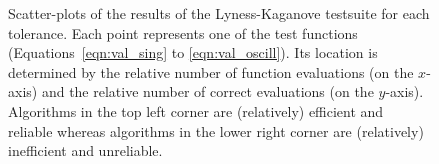 \documentclass[]{article}
\begin{document}
\begin{figure}
    \begin{center}
    \end{center}
    \caption{Scatter-plots of the results of the Lyness-Kaganove
        testsuite for each tolerance. Each point represents one of
        the test functions (Equations~\ref{eqn:val_sing} to \ref{eqn:val_oscill}).
        Its location is determined by the relative number of function evaluations
        (on the $x$-axis) and the relative number of correct evaluations
        (on the $y$-axis). Algorithms in the top left corner are (relatively)
        efficient and reliable whereas algorithms in the lower right corner are
        (relatively) inefficient and unreliable.}
    \label{fig:results}
\end{figure}
\end{document}
